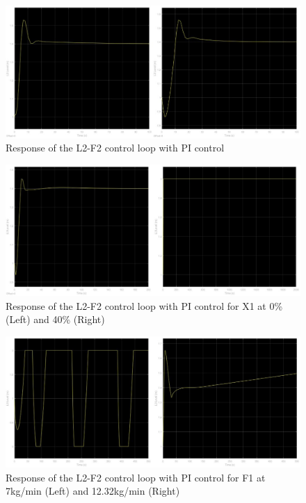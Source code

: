 \documentclass[11pt]{article}
\begin{document}
\begin{figure} [H]
\centering	\includegraphics[scale = 0.6]
{PI_set}
\caption{Response of the L2-F2 control loop with PI control}
\label{PI_set}
\end{figure}

\begin{figure} [H]
\centering	\includegraphics[scale = 0.6]
{X2_levels}
\caption{Response of the L2-F2 control loop with PI control for X1 at 0\% (Left) and 40\% (Right)}
\label{X2_Levels}
\end{figure}

\begin{figure} [H]
\centering	\includegraphics[scale = 0.6]
{F2_levels}
\caption{Response of the L2-F2 control loop with PI control for F1 at 7kg/min (Left) and 12.32kg/min (Right)}
\label{F2_Levels}
\end{figure}
\end{document}
